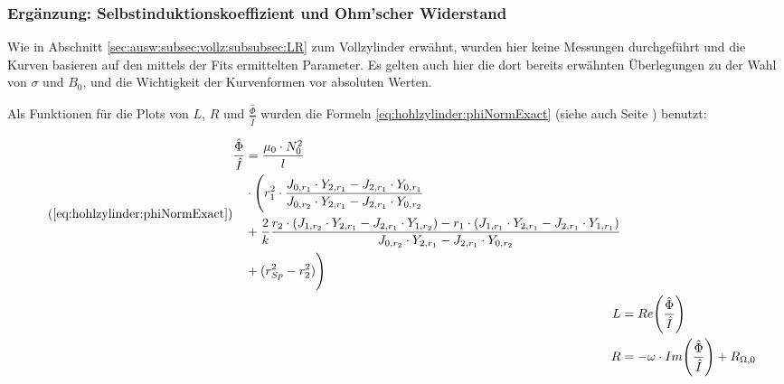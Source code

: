{	\begin{minipage}[t]{0.33\textwidth}
        \vspace{0pt}
        \subsubsection{%
            Erg\"anzung: Selbstinduktionskoeffizient und Ohm'scher Widerstand}
        \label{sec:ausw:subsec:hohlz:cu:subsubsec:LR}

        Wie   in    Abschnitt   \ref{sec:ausw:subsec:vollz:subsubsec:LR}   zum
        Vollzylinder erw\"ahnt, wurden hier keine Messungen durchgef\"uhrt und
        die Kurven basieren auf den mittels der Fits ermittelten Parameter. Es
        gelten auch  hier die dort  bereits erw\"ahnten \"Uberlegungen  zu der
        Wahl von $\sigma$ und $B_0$,  und die Wichtigkeit der Kurvenformen vor
        absoluten Werten.

        Als     Funktionen     f\"ur     die    Plots     von     $L$,     $R$
        und      $\frac{\hat{\Phi}}{\hat{I}}$      wurden     die      Formeln
        \ref{eq:hohlzylinder:phiNormExact}       (siehe       auch       Seite
        \pageref{eq:hohlzylinder:phiNormExact}) benutzt:

        \begin{align}
            \tag{\ref{eq:hohlzylinder:phiNormExact}}
            \begin{split}
            \frac{\hat{\Phi}}{\hat{I}} & = \frac{\mu_0 \cdot N_0^2}{l} \\
                                       & \cdot \Biggl( r_1^2 \cdot \frac{J_{0,r_1} \cdot Y_{2,r_1} - J_{2,r_1} \cdot Y_{0,r_1}}{J_{0,r_2} \cdot Y_{2,r_1} - J_{2,r_1} \cdot Y_{0,r_2}} \\
                                       & + \frac{2}{k} \frac{r_2 \cdot (J_{1,r_2} \cdot Y_{2,r_1} - J_{2,r_1} \cdot Y_{1,r_2}) - r_1 \cdot (J_{1,r_1} \cdot Y_{2,r_1} - J_{2,r_1} \cdot Y_{1,r_1})}{J_{0,r_2} \cdot Y_{2,r_1} - J_{2,r_1} \cdot Y_{0,r_2}} \\
                                       & + (r_{Sp}^2 - r_2^2) \Biggr)
            \end{split} \\
            L & = Re \Biggl(\frac{\hat{\Phi}}{\hat{I}} \Biggr) \\
            R & = - \omega \cdot Im \Biggl(\frac{\hat{\Phi}}{\hat{I}} \Biggr) + R_{\Omega,0}
        \end{align}


\end{minipage}}
